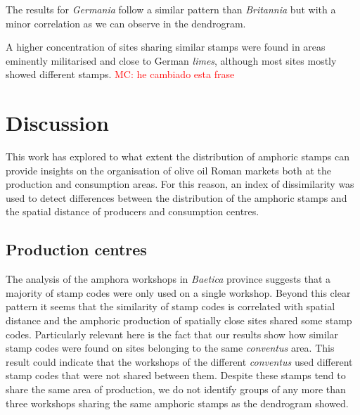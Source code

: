 \documentclass[review]{elsarticle}
\newcommand{\memo}[2]{\textcolor{#1}{#2}}
\newcommand{\maria}[1]{\memo{red}{MC: #1\\}}
\newcommand{\xavi}[1]{\memo{magenta}{XRC: #1\\}}
\begin{document}
The results for \textit{Germania} follow a similar pattern than \textit{Britannia} but with a minor correlation as we can observe in the dendrogram.

A higher concentration of sites sharing similar stamps were found in areas eminently militarised and close to German \textit{limes}, although most sites mostly showed different stamps. 
\maria{he cambiado esta frase}



\section{Discussion}


This work has explored to what extent the distribution of amphoric stamps can provide insights on the organisation of olive oil Roman markets both at the production and consumption areas. For this reason, an index of dissimilarity was used to detect differences between the distribution of the amphoric stamps and the spatial distance of producers and consumption centres. 


\subsection{Production centres}

The analysis of the amphora workshops in \textit{Baetica} province suggests that a majority of stamp codes were only used on a single workshop. Beyond this clear pattern it seems that the similarity of stamp codes is correlated with spatial distance and the amphoric production of spatially close sites shared some stamp codes. Particularly relevant here is the fact that our results show how similar stamp codes were found on sites belonging to the same \textit{conventus} area. This result could indicate that the workshops of the different \textit{conventus} used different stamp codes that were not shared between them. Despite these stamps tend to share the same area of production, we do not identify groups of any more than three workshops sharing the same amphoric stamps as the dendrogram showed. 
\end{document}
